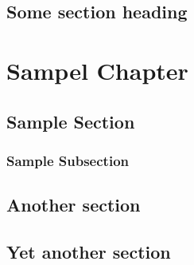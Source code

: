 \documentclass[a4paper,12pt,oneside,final]{report}
\begin{document}
\section{Some section heading}
\paragraph{}
\chapter{Sampel Chapter}
\paragraph{}
\section{Sample Section}
\subsection{Sample Subsection}
\paragraph{}
\paragraph{}
\paragraph{}
\paragraph{}
\paragraph{}
\section{Another section}
\section{Yet another section}

\paragraph{}
\end{document}
